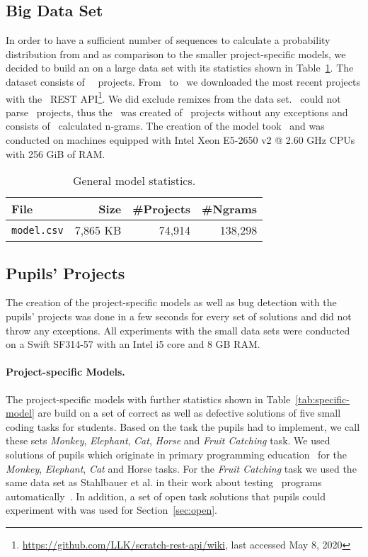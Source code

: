 \subsection{Big Data Set}\label{subsec:trainingset}
In order to have a sufficient number of sequences to calculate a probability distribution from and as comparison to the smaller project-specific models, we decided to build an \ngram{} on a large data set with its statistics shown in Table~\ref{tab:general-model}. The dataset consists of \numlarge\ \scratch\ projects. From \monthstart\ to \monthend\ we downloaded the most recent projects with the \scratch\ REST API\footnote{\url{https://github.com/LLK/scratch-rest-api/wiki}, last accessed May 8, 2020}. We did exclude remixes from the data set. \litterbox\ could not parse \parsingexcp\ projects, thus the \ngram\ was created of \successfullyanalysed\ projects without any exceptions and consists of \calculatedngrams\ calculated n-grams. The creation of the model took \creationtime\ and was conducted on machines equipped with Intel Xeon E5-2650 v2 @ 2.60 GHz CPUs with 256 GiB of RAM.

\begin{table}[hbtp]
    \centering
    \caption[General model statistics]{\label{tab:general-model}General model statistics.}
    \begin{tabular}{lrrr}
        \toprule
        File & Size & \#Projects & \#Ngrams\\
        \midrule
        \texttt{model.csv} & 7,865 KB & 74,914 & 138,298 \\
        \bottomrule
    \end{tabular}
\end{table}

\subsection{Pupils' Projects}\label{subsec:bugset}
The creation of the project-specific models as well as bug detection with the pupils' projects was done in a few seconds for every set of solutions and did not throw any exceptions. All experiments with the small data sets were conducted on a Swift SF314-57 with an Intel i5 core and 8 GB RAM.

\paragraph{Project-specific Models.}
The project-specific models with further statistics shown in Table~\ref{tab:specific-model} are build on a set of correct as well as defective solutions of five small coding tasks for students. Based on the task the pupils had to implement, we call these sets \textit{Monkey}, \textit{Elephant}, \textit{Cat}, \textit{Horse} and \textit{Fruit Catching} task. We used solutions of pupils which originate in primary programming education~\cite{katharina} for the \textit{Monkey}, \textit{Elephant}, \textit{Cat} and {Horse} tasks. For the \textit{Fruit Catching} task we used the same data set as Stahlbauer et al. in their work about testing \scratch\ programs automatically~\cite{whisker}. In addition, a set of open task solutions that pupils could experiment with was used for Section~\ref{sec:open}. 

